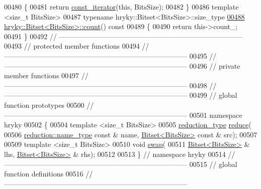 \begin{DoxyCode}
00480 \textcolor{keyword}{}\{
00481     \textcolor{keywordflow}{return} \hyperlink{classhryky_1_1iterator_1_1random_1_1_immutable}{const_iterator}(\textcolor{keyword}{this}, BitsSize);
00482 \}
00486 \textcolor{keyword}{template} <\textcolor{keywordtype}{size\_t} BitsSize>
00487 \textcolor{keyword}{typename} hryky::Bitset<BitsSize>::size\_type 
\hypertarget{bitset_8h_source_l00488}{}\hyperlink{classhryky_1_1_bitset_a20d189bc95da6a2aef278b8ab953d667}{00488} \hyperlink{classhryky_1_1_bitset}{hryky::Bitset<BitsSize>::count}()\textcolor{keyword}{ const}
00489 \textcolor{keyword}{}\{
00490     \textcolor{keywordflow}{return} this->count\_;
00491 \}
00492 \textcolor{comment}{//
      ------------------------------------------------------------------------------}
00493 \textcolor{comment}{// protected member functions}
00494 \textcolor{comment}{//
      ------------------------------------------------------------------------------}
00495 \textcolor{comment}{//
      ------------------------------------------------------------------------------}
00496 \textcolor{comment}{// private member functions}
00497 \textcolor{comment}{//
      ------------------------------------------------------------------------------}
00498 \textcolor{comment}{//
      ------------------------------------------------------------------------------}
00499 \textcolor{comment}{// global function prototypes}
00500 \textcolor{comment}{//
      ------------------------------------------------------------------------------}
00501 \textcolor{keyword}{namespace }hryky
00502 \{
00504     \textcolor{keyword}{template} <\textcolor{keywordtype}{size\_t} BitsSize>
00505     \hyperlink{classhryky_1_1_intrusive_ptr}{reduction_type} \hyperlink{namespacehryky_af41cb3af6766761da0ff21b84527a52c}{reduce}(
00506         \hyperlink{classhryky_1_1reduction_1_1_string}{reduction::name_type} \textcolor{keyword}{const} & name, \hyperlink{classhryky_1_1_bitset}{Bitset<BitsSize>} \textcolor{keyword}{const} & src);
00507 
00509     \textcolor{keyword}{template} <\textcolor{keywordtype}{size\_t} BitsSize>
00510     \textcolor{keywordtype}{void} \hyperlink{namespacehryky_a4282146df5ea2b68cb667896a2205909}{swap}(
00511         \hyperlink{classhryky_1_1_bitset}{Bitset<BitsSize>} & lhs, \hyperlink{classhryky_1_1_bitset}{Bitset<BitsSize>} & rhs);
00512 
00513 \} \textcolor{comment}{// namespace hryky}
00514 \textcolor{comment}{//
      ------------------------------------------------------------------------------}
00515 \textcolor{comment}{// global function definitions}
00516 \textcolor{comment}{//
      ------------------------------------------------------------------------------}

\end{DoxyCode}
